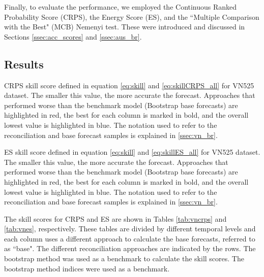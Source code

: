 \documentclass[a4paper,11pt]{article}
\theoremstyle{definition}
\begin{document}
Finally, to evaluate the performance, we employed the Continuous Ranked Probability Score (CRPS), the Energy Score (ES), and the “Multiple Comparison with the Best" (MCB) Nemenyi test. These were introduced and discussed in Sections \ref{ssec:acc_scores} and \ref{ssec:aus_br}. %

\subsection{Results}

\begin{table}[p]
	\centering
	\begingroup
	\fontsize{9}{10}\selectfont
	
	\endgroup
	\caption{CRPS skill score defined in equation \eqref{eq:skill} and \eqref{eq:skillCRPS_all} for VN525 dataset. The smaller this value, the more accurate the forecast. Approaches that performed worse than the benchmark model (Bootstrap base forecasts) are highlighted in red, the best for each column is marked in bold, and the overall lowest value is highlighted in blue. The notation used to refer to the reconciliation and base forecast samples is explained in \autoref{ssec:vn_br}.}
	\label{tab:vncrps}
\end{table}

\begin{table}[p]
	\centering
	\begingroup
	\fontsize{9}{10}\selectfont
	
	\endgroup
	\caption{ES skill score defined in equation \eqref{eq:skill} and \eqref{eq:skillES_all} for VN525 dataset. The smaller this value, the more accurate the forecast. Approaches that performed worse than the benchmark model (Bootstrap base forecasts) are highlighted in red, the best for each column is marked in bold, and the overall lowest value is highlighted in blue. The notation used to refer to the reconciliation and base forecast samples is explained in \autoref{ssec:vn_br}.}
	\label{tab:vnes}
\end{table}

The skill scores for CRPS and ES are shown in Tables \ref{tab:vncrps} and \ref{tab:vnes}, respectively. These tables are divided by different temporal levels and each column uses a different approach to calculate the base forecasts, referred to as “base". The different reconciliation approaches are indicated by the rows. The bootstrap method was used as a benchmark to calculate the skill scores. The bootstrap method indices were used as a benchmark.
\end{document}
